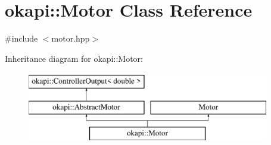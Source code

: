 \hypertarget{classokapi_1_1Motor}{}\section{okapi\+::Motor Class Reference}
\label{classokapi_1_1Motor}


{\ttfamily \#include $<$motor.\+hpp$>$}

Inheritance diagram for okapi\+::Motor\+:\begin{figure}[H]
\begin{center}
\leavevmode
\includegraphics[height=3.000000cm]{classokapi_1_1Motor}
\end{center}
\end{figure}
